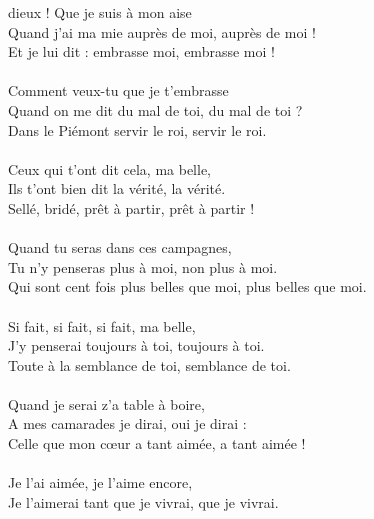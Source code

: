 
 dieux ! Que je suis à mon aise
\\Quand j’ai ma mie auprès de moi, auprès de moi !
\\
{Et je lui dit : embrasse moi, embrasse moi !}
\\\\Comment veux-tu que je t’embrasse
\\Quand on me dit du mal de toi, du mal de toi ?
\\
{Dans le Piémont servir le roi, servir le roi.}
\\\\Ceux qui t’ont dit cela, ma belle,
\\Ils t’ont bien dit la vérité, la vérité.
\\
{Sellé, bridé, prêt à partir, prêt à partir !}
\\\\Quand tu seras dans ces campagnes,
\\Tu n’y penseras plus à moi, non plus à moi.
\\
{Qui sont cent fois plus belles que moi, plus belles que moi.}
\\\\Si fait, si fait, si fait, ma belle,
\\J’y penserai toujours à toi, toujours à toi.
\\
{Toute à la semblance de toi, semblance de toi.}
\\\\Quand je serai z’a table à boire,
\\A mes camarades je dirai, oui je dirai :
\\
{Celle que mon cœur a tant aimée, a tant aimée !}
\\\\Je l’ai aimée, je l’aime encore,
\\Je l’aimerai tant que je vivrai, que je vivrai.

